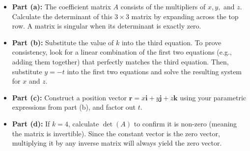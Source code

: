 \begin{hint}
\begin{itemize}
    \item \textbf{Part (a):} The coefficient matrix $A$ consists of the multipliers of $x, y,$ and $z$. Calculate the determinant of this $3 \times 3$ matrix by expanding across the top row. A matrix is singular when its determinant is exactly zero.
    \item \textbf{Part (b):} Substitute the value of $k$ into the third equation. To prove consistency, look for a linear combination of the first two equations (e.g., adding them together) that perfectly matches the third equation. Then, substitute $y = -t$ into the first two equations and solve the resulting system for $x$ and $z$.
    \item \textbf{Part (c):} Construct a position vector $\mathbf{r} = x\mathbf{i} + y\mathbf{j} + z\mathbf{k}$ using your parametric expressions from part (b), and factor out $t$. 
    \item \textbf{Part (d):} If $k = 4$, calculate $\det(A)$ to confirm it is non-zero (meaning the matrix is invertible). Since the constant vector is the zero vector, multiplying it by any inverse matrix will always yield the zero vector. 
\end{itemize}
\end{hint}

